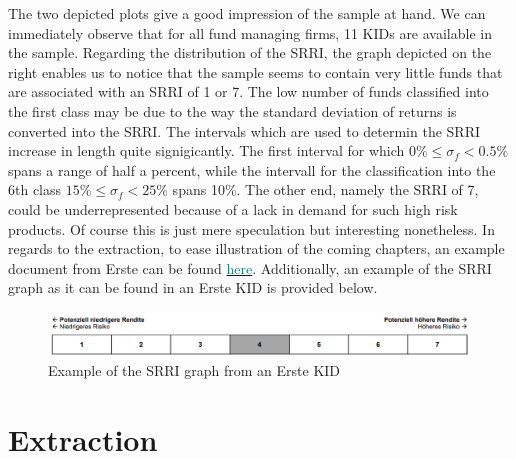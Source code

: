 \documentclass[aodsor,preprint]{imsart}
\numberwithin{equation}{section}
\theoremstyle{plain}
\begin{document}
The two depicted plots give a good impression of the sample at hand. We can immediately observe that for all fund managing firms, 11 KIDs are available in the sample. Regarding the distribution of the SRRI, the graph depicted on the right enables us to notice that the sample seems to contain very little funds that are associated with an SRRI of 1 or 7. The low number of funds classified into the first class may be due to the way the standard deviation of returns is converted into the SRRI. The intervals which are used to determin the SRRI increase in length quite signigicantly. The first interval for which $0\% \leq\sigma_f<0.5\%$ spans a range of half a percent, while the intervall for the classification into the 6th class $15\%\leq\sigma_f<25\%$ spans 10\%. The other end, namely the SRRI of 7, could be underrepresented because of a lack in demand for such high risk products. Of course this is just mere speculation but interesting nonetheless.
In regards to the extraction, to ease illustration of the coming chapters, an example document from Erste can be found \href{https://github.com/Base-R-Best-R/KID/blob/main/KIDs/Erste/kid-eb-147-t2957-at_de-de_en_4.pdf}{\textcolor{teal}{here}}. Additionally, an example of the SRRI graph as it can be found in an Erste KID is provided below.

\begin{figure}[H]
	\includegraphics[width = 12cm]{example_SRRI_graph}
	\caption{Example of the SRRI graph from an Erste KID}
\end{figure}


\section{Extraction}
\end{document}
